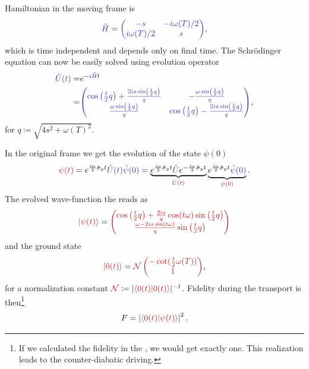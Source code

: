 Hamiltonian in the moving frame is
\begin{equation}
    \bluee{\tilde H}=\bluee{\begin{pmatrix}
        -s&-i\omega(T)/2\\
        i\omega(T)/2&s
    \end{pmatrix}},
\end{equation}
which is time independent and depends only on final time. The Schr\"odinger equation can now be easily solved using evolution operator
\begin{equation}
    \begin{split}
        \bluee{\UU(t)}=&e^{-i\bluee{\tilde H}t}\\
        =&\bluee{\begin{pmatrix}
            \cos \left(\frac{t}{2} q\right)+\frac{2 i s \sin \left(\frac{t}{2} q\right)}{q} & -\frac{\omega  \sin \left(\frac{t}{2} q\right)}{q} \\
            \frac{\omega  \sin \left(\frac{t}{2} q\right)}{q} & \cos \left(\frac{t}{2} q\right)-\frac{2 i s \sin \left(\frac{t}{2} q\right)}{q} \\
        \end{pmatrix}},
    \end{split}
    \label{eq:evolutionBlue}
\end{equation}
for $q\coloneqq\sqrt{4 s^2+\omega(T) ^2}$.

In the original frame we get the evolution of the state $\psi(0)$
\begin{equation}
    \redd{\psi(t)}=\expsp \bluee{\UU(t) \tilde\psi(0)} = \underbrace{\expsp \bluee{\UU}\expsm}_{\redd{\UU(t)}} \underbrace{\expsp \bluee{\tilde\psi(0)}}_{\redd{\psi(0)}}.
\end{equation}
The evolved wave-function the reads as
\begin{equation}
    \redd{\ket{\psi(t)}}=\redd{\begin{pmatrix}
        \cos \left(\frac{t}{2} q\right)+\frac{2 i s}{q} \cos (t \omega ) \sin \left(\frac{t}{2} q\right)\\
        \frac{\omega -2 i s\sin (t \omega )}{q}  \sin \left(\frac{t}{2} q\right)
    \end{pmatrix}}
\end{equation}
and the ground state
\begin{equation}
    \redd{\ket{0(t)}}=\redd{\mathcal{N}\begin{pmatrix}
        -\cot (\frac{t}{2}\omega(T))\\
        1
    \end{pmatrix}},
\end{equation}
for a normalization constant $\redd{\mathcal{N}}\coloneqq |\redd{\braket{0(t)|0(t)}}|^{-1}$.
Fidelity during the transport is then\footnote{If we calculated the fidelity in the , we would get exactly one. This realization leads to the counter-diabatic driving.}
\begin{equation}
    F=\left|\redd{\braket{0(t)|\psi(t)}}\right|^2.
    \label{fid:definition}
\end{equation}

